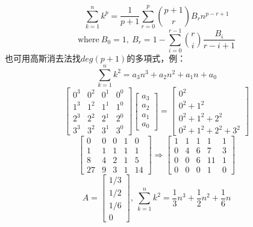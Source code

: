 \[ \sum_{k=1}^{n} k^p = \frac{1}{p+1} \sum_{r=0}^{p} \binom{p+1}{r} B_rn^{p-r+1} \]
\[ \text{where} \ B_0 = 1, \ B_r = 1-\sum_{i=0}^{r-1} \binom{r}{i} \frac{B_i}{r-i+1} \]
也可用高斯消去法找$deg(p+1)$的多項式，例：
\[ \sum_{k=1}^{n} k^2 = a_3n^3 + a_2n^2 + a_1n + a_0 \]
\tiny\[
    \begin{bmatrix}
        0^3 & 0^2 & 0^1 & 0^0\\
        1^3 & 1^2 & 1^1 & 1^0\\
        2^3 & 2^2 & 2^1 & 2^0\\
        3^3 & 3^2 & 3^1 & 3^0
    \end{bmatrix}
    \begin{bmatrix}
        a_3 \\ a_2 \\ a_1 \\ a_0
    \end{bmatrix} =
    \begin{bmatrix}
        0^2 \\ 0^2+1^2 \\ 0^2+1^2+2^2 \\ 0^2+1^2+2^2+3^2
    \end{bmatrix}
\]
\tiny\[
    \begin{bmatrix}
        0 & 0 & 0 & 1 & 0 \\
        1 & 1 & 1 & 1 & 1 \\
        8 & 4 & 2 & 1 & 5 \\
        27 & 9 & 3 & 1 & 14
    \end{bmatrix}
    \Rightarrow \begin{bmatrix}
        1 & 1 & 1 & 1 & 1 \\
        0 & 4 & 6 & 7 & 3 \\
        0 & 0 & 6 & 11 & 1 \\
        0 & 0 & 0 & 1 & 0
    \end{bmatrix}
\]
\[ 
    A = \begin{bmatrix}
        1/3 \\ 1/2 \\ 1/6 \\ 0 
    \end{bmatrix}, \ 
    \sum_{k=1}^{n} k^2 = \frac{1}{3}n^3 + \frac{1}{2}n^2 + \frac{1}{6}n
\]